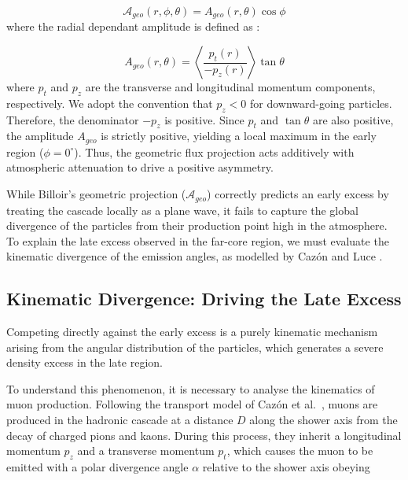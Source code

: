\documentclass[11pt,a4paper]{article}
\begin{document}
\begin{equation}
    \mathcal{A}_{geo}(r, \phi, \theta) = A_{geo}(r, \theta) \cos \phi
    \label{eq:geometric_effect_full}
\end{equation}
%
where the radial dependant amplitude is defined as \cite{GAP2000_017}:

\begin{equation}
    A_{geo}(r, \theta) = \left\langle \frac{p_t(r)}{-p_z(r)} \right\rangle \tan \theta
    \label{eq:geometric_effect}
\end{equation}
%
where $p_t$ and $p_z$ are the transverse and longitudinal momentum components, respectively. We adopt the convention that $p_z < 0$ for downward-going particles. Therefore, the denominator $-p_z$ is positive. Since $p_t$ and $\tan\theta$ are also positive, the amplitude $A_{geo}$ is strictly positive, yielding a local maximum in the early region ($\phi = 0^\circ$). Thus, the geometric flux projection acts additively with atmospheric attenuation to drive a positive asymmetry.

While Billoir's geometric projection ($\mathcal{A}_{geo}$) correctly predicts an early excess by treating the cascade locally as a plane wave, it fails to capture the global divergence of the particles from their production point high in the atmosphere. To explain the late excess observed in the far-core region, we must evaluate the kinematic divergence of the emission angles, as modelled by Cazón and Luce \cite{Cazon2012, Luce_ICRC2021}.

\subsection{Kinematic Divergence: Driving the Late Excess}
\label{subsec:divergence}

Competing directly against the early excess is a purely kinematic mechanism arising from the angular distribution of the particles, which generates a severe density excess in the late region. 

To understand this phenomenon, it is necessary to analyse the kinematics of muon production. Following the transport model of Cazón et al.~\cite{Cazon2012}, muons are produced in the hadronic cascade at a distance $D$ along the shower axis from the decay of charged pions and kaons. During this process, they inherit a longitudinal momentum $p_z$ and a transverse momentum $p_t$, which causes the muon to be emitted with a polar divergence angle $\alpha$ relative to the shower axis obeying
\end{document}
